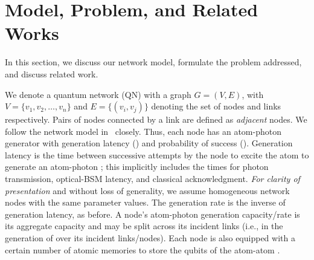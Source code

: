 \section{Model, Problem, and Related Works}
\label{sec:swapping_problem}

In this section, we discuss our network model, formulate the problem addressed, and discuss 
related work. 

We denote a quantum network (QN) with a graph $G = (V, E)$,
with $V = \{v_1, v_2, \ldots, v_n\}$  and $E = \{(v_i, v_j)\}$
denoting the set of nodes and links respectively.
Pairs of nodes connected by a link are defined as \textit{adjacent} nodes. 
We follow the network model in~\cite{caleffi} closely.
Thus, each node has an atom-photon \eps generator with generation 
latency (\gt) and probability of success (\gp). Generation latency
is the time between successive attempts by the node to excite the 
atom to generate an atom-photon \eps; this implicitly includes the times for
photon transmission, optical-BSM latency, and classical acknowledgment.
\textit{For clarity of presentation} and without loss of generality,  
we assume homogeneous network nodes with the same parameter values.
The generation rate is the inverse
of generation latency, as before.
A node's atom-photon generation capacity/rate 
is its aggregate capacity and may be split across its incident links 
(i.e., in the generation 
of \epss over its incident links/nodes).
Each node is also equipped with a certain number of atomic
memories to store the qubits of the atom-atom \epss. 

